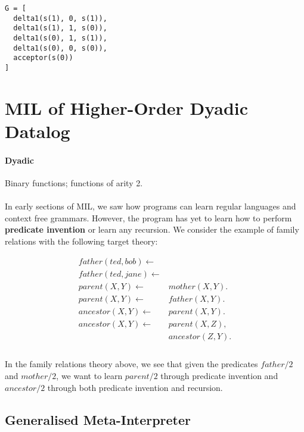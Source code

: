 \documentclass{article}
\theoremstyle{plain}
\theoremstyle{definition}
\begin{document}
\begin{multicols}{2}
\begin{lstlisting}
G = [
  delta1(s(1), 0, s(1)),
  delta1(s(1), 1, s(0)),
  delta1(s(0), 1, s(1)),
  delta1(s(0), 0, s(0)),
  acceptor(s(0))
]
\end{lstlisting}

\section{MIL of Higher-Order Dyadic Datalog}

\paragraph{Dyadic} Binary functions; functions of arity 2.

\paragraph{} In early sections of MIL, we saw how programs can learn regular languages and context free grammars. However, the program has yet to learn how to perform \textbf{predicate invention} or learn any recursion. We consider the example of family relations with the following target theory:

\begin{align*}
father(ted, bob) \leftarrow&\\
father(ted, jane) \leftarrow&\\
parent(X, Y) \leftarrow\ &mother(X, Y).\\
parent(X, Y) \leftarrow\ &father(X, Y).\\
ancestor(X, Y) \leftarrow\ &parent(X, Y).\\
ancestor(X, Y) \leftarrow\ &parent(X, Z),\\ &ancestor(Z, Y).\\
\end{align*}

\paragraph{} In the family relations theory above, we see that given the predicates $father/2$ and $mother/2$, we want to learn $parent/2$ through predicate invention and $ancestor/2$ through both predicate invention and recursion.

\subsection{Generalised Meta-Interpreter}


\end{multicols}
\end{document}
